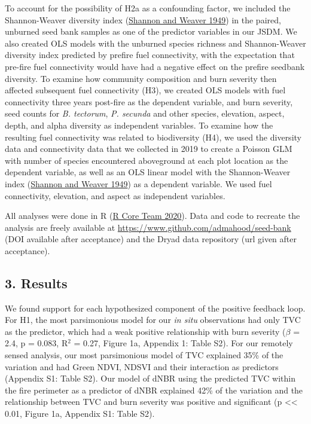 \documentclass[
  12pt,
]{article}
\begin{document}
To account for the possibility of H2a as a confounding factor, we
included the Shannon-Weaver diversity index
(\protect\hyperlink{ref-Shannon1949}{Shannon and Weaver 1949}) in the
paired, unburned seed bank samples as one of the predictor variables in
our JSDM. We also created OLS models with the unburned species richness
and Shannon-Weaver diversity index predicted by prefire fuel
connectivity, with the expectation that pre-fire fuel connectivity would
have had a negative effect on the prefire seedbank diversity. To examine
how community composition and burn severity then affected subsequent
fuel connectivity (H3), we created OLS models with fuel connectivity
three years post-fire as the dependent variable, and burn severity, seed
counts for \emph{B. tectorum}, \emph{P. secunda} and other species,
elevation, aspect, depth, and alpha diversity as independent variables.
To examine how the resulting fuel connectivity was related to
biodiversity (H4), we used the diversity data and connectivity data that
we collected in 2019 to create a Poisson GLM with number of species
encountered aboveground at each plot location as the dependent variable,
as well as an OLS linear model with the Shannon-Weaver index
(\protect\hyperlink{ref-Shannon1949}{Shannon and Weaver 1949}) as a
dependent variable. We used fuel connectivity, elevation, and aspect as
independent variables.

All analyses were done in R (\protect\hyperlink{ref-R}{R Core Team
2020}). Data and code to recreate the analysis are freely available at
\url{https://www.github.com/admahood/seed-bank} (DOI available after
acceptance) and the Dryad data repository (url given after acceptance).

\hypertarget{results}{%
\subsection{3. Results}\label{results}}

We found support for each hypothesized component of the positive
feedback loop. For H1, the most parsimonious model for our \emph{in
situ} observations had only TVC as the predictor, which had a weak
positive relationship with burn severity (\(\beta\) = 2.4, p = 0.083,
R\(^2\) = 0.27, Figure 1a, Appendix 1: Table S2). For our remotely
sensed analysis, our most parsimonious model of TVC explained 35\% of
the variation and had Green NDVI, NDSVI and their interaction as
predictors (Appendix S1: Table S2). Our model of dNBR using the
predicted TVC within the fire perimeter as a predictor of dNBR explained
42\% of the variation and the relationship between TVC and burn severity
was positive and significant (p \textless\textless{} 0.01, Figure 1a,
Appendix S1: Table S2).
\end{document}
